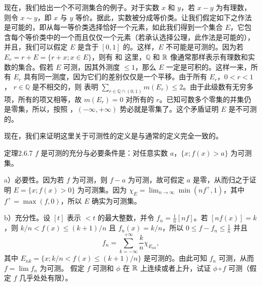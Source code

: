 现在，我们给出一个不可测集合的例子。对于实数 $x$ 和 $y$，若 $x-y$ 为有理数，则令 $x\sim y$，即 $x$ 与 $y$ 等价。据此，实数被分成等价类。让我们假定如下之作法是可能的，即从每一等价类选择恰好一个元素，如此我们得到一个集合 $E$，它包含每个等价类中的一个而且仅仅一个元素（若承认选择公理，此作法是可能的），并且，我们可以假定 $E$ 是含于 $[0,1]$ 的。这样，$E$ 不可能是可测的。因为若 $E_r=r+E=\{r+x;x\in E\}$，则有
和
这里，$\mathbb Q$ 和 $\mathbb R$ 像通常那样表示有理数和实数的集合。假若 $E$ 可测，因其外测度 $\le1$，那么 $E$ 一定是可积的。这样一来，所有 $E_r$ 具有同一测度，因为它们的差别仅仅是一个平移。由于所有 $E_r$，$0<r<1$，
$r\in\mathbb Q$ 是不相交的，则  表明 $\sum_{r\in\mathbb Q\cap(0,1)}m(E_r)\le2$。由于此级数有无穷多项，所有的项又相等，故 $m(E_r)=0$ 对所有的 $r$。已知可数多个零集的并集仍是零集，所以，按照 ，$(-\infty,+\infty)$ 势必就是零集了。这个矛盾证明 $E$ 是不可测的。

现在，我们来证明这里关于可测性的定义是与通常的定义完全一致的。
\begin{statement}{定理}{2.6.7}
$f$ 是可测的充分与必要条件是：对任意实数 $a$，$\{x;f(x)>a\}$ 为可测集。
\end{statement}
\Proof a）必要性。因为若 $f$ 为可测，则 $f-a$ 为可测，故可假定 $a$ 是零，从而归之于证明 $E=\{x;f(x)>0\}$ 为可测集。因为 $\chi_E=\lim_{n\to\infty}\min(nf^+,1)$，其中 $f^+=\max(f,0)$，所以 $E$ 确实为可测集。

b）充分性。设 $[t]$ 表示 $<t$ 的最大整数，并令 $f_n=\frac1n[nf]$。若 $[nf(x)]=k$，则 $k/n<f(x)\le(k+1)/n$ 且 $f_n(x)=k/n$，所以 $0\le f-f_n\le\frac1n$ 并且
\[f_n=\sum_{k=-\infty}^{+\infty}\frac kn\chi_{E_{nk}},\]
其中 $E_{nk}=\{x;k/n<f(x)\le(k+1)/n\}$ 是可测的。由此可知 $f_n$ 可测，从而 $f=\lim f_n$ 为可测。
\Exercise 假定 $f$ 可测和 $\phi$ 在 $\mathbb R$ 上连续或者上升，试证 $\phi\circ f$ 可测（假定 $f$ 几乎处处有限）。

